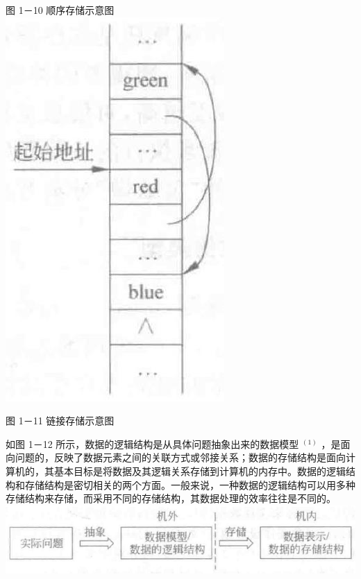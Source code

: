 \documentclass[10pt]{article}
\begin{document}
图 1－10 顺序存储示意图\\
\includegraphics[max width=\textwidth, center]{2025_06_06_704745ea57b15b2333e5g-024(3)}

图 1－11 链接存储示意图

如图 1－12 所示，数据的逻辑结构是从具体问题抽象出来的数据模型 ${ }^{(1)}$ ，是面向问题的，反映了数据元素之间的关联方式或邻接关系；数据的存储结构是面向计算机的，其基本目标是将数据及其逻辑关系存储到计算机的内存中。数据的逻辑结构和存储结构是密切相关的两个方面。一般来说，一种数据的逻辑结构可以用多种存储结构来存储，而采用不同的存储结构，其数据处理的效率往往是不同的。\\
\includegraphics[max width=\textwidth, center]{2025_06_06_704745ea57b15b2333e5g-024}
\end{document}
